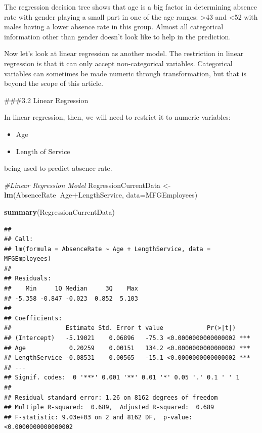 \documentclass[12pt, krantz2,]{krantz}
\makeatletter
\newenvironment{Shaded}{\begin{snugshade}}{\end{snugshade}}
\newcommand{\CommentTok}[1]{\textcolor[rgb]{0.37,0.37,0.37}{\textit{#1}}}
\newcommand{\DataTypeTok}[1]{\textcolor[rgb]{0.27,0.27,0.27}{#1}}
\newcommand{\KeywordTok}[1]{\textcolor[rgb]{0.27,0.27,0.27}{\textbf{#1}}}
\newcommand{\NormalTok}[1]{#1}
\newcommand{\OperatorTok}[1]{\textcolor[rgb]{0.43,0.43,0.43}{\textbf{#1}}}
\newcommand{\StringTok}[1]{\textcolor[rgb]{0.5,0.5,0.5}{#1}}
\providecommand{\tightlist}{%
  \setlength{\itemsep}{0pt}\setlength{\parskip}{0pt}}
\newenvironment{kframe}{%
\medskip{}
\setlength{\fboxsep}{.8em}
 \def\at@end@of@kframe{}%
 \ifinner\ifhmode%
  \def\at@end@of@kframe{\end{minipage}}%
  \begin{minipage}{\columnwidth}%
 \fi\fi%
 \def\FrameCommand##1{\hskip\@totalleftmargin \hskip-\fboxsep
 \colorbox{shadecolor}{##1}\hskip-\fboxsep
     \hskip-\linewidth \hskip-\@totalleftmargin \hskip\columnwidth}%
 \MakeFramed {\advance\hsize-\width
   \@totalleftmargin\z@ \linewidth\hsize
   \@setminipage}}%
 {\par\unskip\endMakeFramed%
 \at@end@of@kframe}
\renewenvironment{Shaded}{\begin{kframe}}{\end{kframe}}
\makeatother
\begin{document}
The regression decision tree shows that age is a big factor in determining absence rate with gender playing a small part in one of the age ranges: \textgreater{}43 and \textless{}52 with males having a lower absence rate in this group. Almost all categorical information other than gender doesn't look like to help in the prediction.

Now let's look at linear regression as another model. The restriction in linear regression is that it can only accept non-categorical variables. Categorical variables can sometimes be made numeric through transformation, but that is beyond the scope of this article.

\#\#\#3.2 Linear Regression

In linear regression, then, we will need to restrict it to numeric variables:

\begin{itemize}
\tightlist
\item
  Age
\item
  Length of Service
\end{itemize}

being used to predict absence rate.

\begin{Shaded}
\begin{Highlighting}[]
\CommentTok{#Linear Regression Model}
\NormalTok{RegressionCurrentData <-}\StringTok{ }\KeywordTok{lm}\NormalTok{(AbsenceRate}\OperatorTok{~}\NormalTok{Age}\OperatorTok{+}\NormalTok{LengthService, }\DataTypeTok{data=}\NormalTok{MFGEmployees)}

\KeywordTok{summary}\NormalTok{(RegressionCurrentData)}
\end{Highlighting}
\end{Shaded}

\begin{verbatim}
## 
## Call:
## lm(formula = AbsenceRate ~ Age + LengthService, data = MFGEmployees)
## 
## Residuals:
##    Min     1Q Median     3Q    Max 
## -5.358 -0.847 -0.023  0.852  5.103 
## 
## Coefficients:
##               Estimate Std. Error t value            Pr(>|t|)    
## (Intercept)   -5.19021    0.06896   -75.3 <0.0000000000000002 ***
## Age            0.20259    0.00151   134.2 <0.0000000000000002 ***
## LengthService -0.08531    0.00565   -15.1 <0.0000000000000002 ***
## ---
## Signif. codes:  0 '***' 0.001 '**' 0.01 '*' 0.05 '.' 0.1 ' ' 1
## 
## Residual standard error: 1.26 on 8162 degrees of freedom
## Multiple R-squared:  0.689,  Adjusted R-squared:  0.689 
## F-statistic: 9.03e+03 on 2 and 8162 DF,  p-value: <0.0000000000000002
\end{verbatim}
\end{document}

